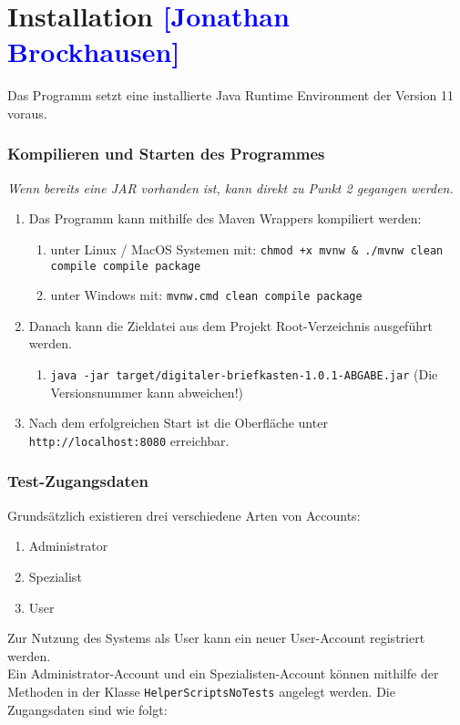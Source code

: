 

\section{Installation \textcolor{blue}{[Jonathan Brockhausen]}}
\label{instal}
Das Programm setzt eine installierte Java Runtime Environment der Version 11 voraus.
\subsubsection*{Kompilieren und Starten des Programmes}
\textit{Wenn bereits eine JAR vorhanden ist, kann direkt zu Punkt 2 gegangen werden.}
\begin{enumerate}
	\item{Das Programm kann mithilfe des Maven Wrappers kompiliert werden:}
	\begin{enumerate}
		\item{unter Linux / MacOS Systemen mit: \texttt{chmod +x mvnw \& ./mvnw clean compile compile package}}
		\item{unter Windows mit: \texttt{mvnw.cmd clean compile package}}
	\end{enumerate}
	\item{Danach kann die Zieldatei aus dem Projekt Root-Verzeichnis ausgeführt werden.}
	\begin{enumerate}
		\item{\texttt{java -jar target/digitaler-briefkasten-1.0.1-ABGABE.jar} (Die Versionsnummer kann abweichen!)}
	\end{enumerate}
	\item{Nach dem erfolgreichen Start ist die Oberfläche unter \texttt{http://localhost:8080} erreichbar.}
\end{enumerate}

\subsubsection*{Test-Zugangsdaten}
Grundsätzlich existieren drei verschiedene Arten von Accounts:
\begin{enumerate}
	\item{Administrator}
	\item{Spezialist}
	\item{User}
\end{enumerate}

Zur Nutzung des Systems als User kann ein neuer User-Account registriert werden.\\
Ein Administrator-Account und ein Spezialisten-Account können mithilfe der Methoden in der Klasse \texttt{HelperScriptsNoTests} angelegt werden. Die Zugangsdaten sind wie folgt:\\

